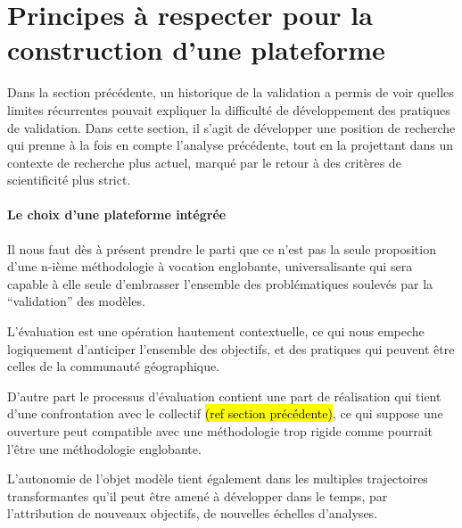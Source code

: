 
\section{Principes à respecter pour la construction d'une plateforme }
\label{sec:constante_problematique}



Dans la section précédente, un historique de la validation a permis de voir quelles limites récurrentes pouvait expliquer la difficulté de développement des pratiques de validation. Dans cette section, il s'agit de développer une position de recherche qui prenne à la fois en compte l'analyse précédente, tout en la projettant dans un contexte de recherche plus actuel, marqué par le retour à des critères de scientificité plus strict. 

\paragraph{Le choix d'une plateforme intégrée}

Il nous faut dès à présent prendre le parti que ce n'est pas la seule proposition d'une n-ième méthodologie à vocation englobante, universalisante qui sera capable à elle seule d'embrasser l'ensemble des problématiques soulevés par la \enquote{validation} des modèles.

L'évaluation est une opération hautement contextuelle, ce qui nous empeche logiquement d'anticiper l'ensemble des objectifs, et des pratiques qui peuvent être celles de la communauté géographique. 

D'autre part le processus d'évaluation contient une part de réalisation qui tient d'une confrontation avec le collectif \hl{(ref section précédente)}, ce qui suppose une ouverture peut compatible avec une méthodologie trop rigide comme pourrait l'être une méthodologie englobante.

L'autonomie de l'objet modèle tient également dans les multiples trajectoires transformantes qu'il peut être amené à développer dans le temps, par l'attribution de nouveaux objectifs, de nouvelles échelles d'analyses. \autocite{Banos2013a}

